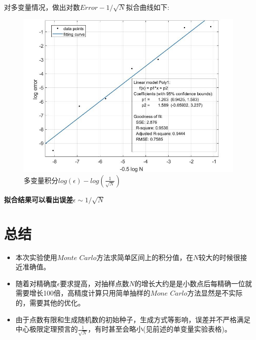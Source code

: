 \documentclass[UTF8]{ctexart}
\begin{document}
	对多变量情况，做出对数$Error-1/\sqrt{N}$拟合曲线如下:
	\begin{figure}[H]
		\centering  %
		\includegraphics[width=6in]{../figure/multi.jpg}
		\caption{多变量积分$log(\epsilon)-log(\frac{1}{\sqrt{N}})$}
	\end{figure}

	\textbf{拟合结果可以看出误差$\epsilon\sim1/\sqrt{N}$}
	\section{总结}
	\begin{itemize}
		\item 本次实验使用$Monte\,\,Carlo$方法求简单区间上的积分值，在$N$较大的时候很接近准确值。
		\item 随着对精确度$\epsilon$要求提高，对抽样点数$N$的增长大约是是小数点后每精确一位就需要增长100倍，高精度计算只用简单抽样的$Mone\,\,Carlo$方法显然是不实际的，需要其他的优化。
		\item 由于点数有限和生成随机数的初始种子，生成方式等影响，误差并不严格满足中心极限定理预言的$\frac{1}{\sqrt{N}}$，有时甚至会略小(见前述的单变量实验表格)。
	\end{itemize}
	\clearpage
\end{document}
